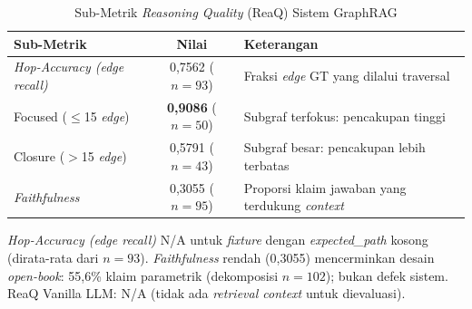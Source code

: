 \renewcommand{\arraystretch}{1.3}
\captionsetup[table]{justification=raggedright,singlelinecheck=false}
\begin{table}[H]
\caption{Sub-Metrik \textit{Reasoning Quality} (ReaQ) Sistem GraphRAG}
\label{tbl:reaq_submetrics}
\centering
\begin{tabular}{| p{} | c | p{} |}
\hline
\textbf{Sub-Metrik} & \textbf{Nilai} & \textbf{Keterangan} \\
\hline
\textit{Hop-Accuracy (edge recall)} & 0,7562 ($n{=}93$) & Fraksi \textit{edge} GT yang dilalui traversal \parencite{manning_ir_2008} \\
\hline
\quad Focused ($\leq$15 \textit{edge}) & \textbf{0,9086} ($n{=}50$) & Subgraf terfokus: pencakupan tinggi \\
\hline
\quad Closure ($>$15 \textit{edge}) & 0,5791 ($n{=}43$) & Subgraf besar: pencakupan lebih terbatas \\
\hline
\textit{Faithfulness} & 0,3055 ($n{=}95$) & Proporsi klaim jawaban yang terdukung \textit{context} \parencite{es_ragas_2023} \\
\hline
\end{tabular}
\end{table}
{\small\noindent \textit{Hop-Accuracy (edge recall)} N/A untuk \textit{fixture} dengan \textit{expected\_path} kosong (dirata-rata dari $n{=}93$). \textit{Faithfulness} rendah (0,3055) mencerminkan desain \textit{open-book}: 55,6\% klaim parametrik (dekomposisi $n{=}102$); bukan defek sistem. ReaQ Vanilla LLM: N/A (tidak ada \textit{retrieval context} untuk dievaluasi).}
